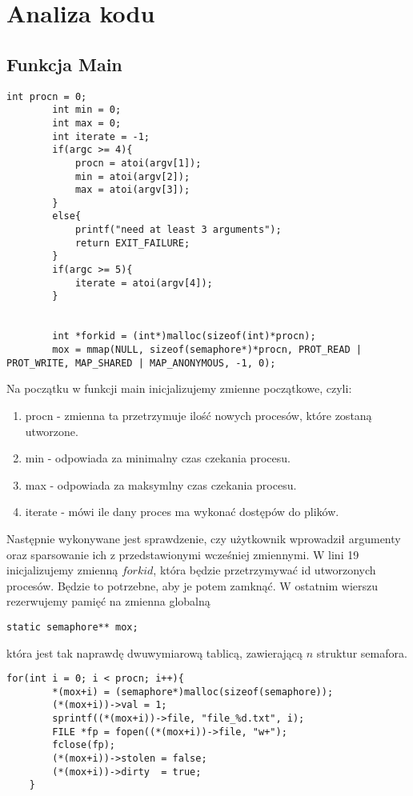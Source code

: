 \documentclass[11pt, wide]{article}
\begin{document}
    \section{Analiza kodu}
    \subsection{Funkcja Main}
    \begin{lstlisting}[style=CStyle]
        int procn = 0;
        int min = 0;
        int max = 0;
        int iterate = -1;
        if(argc >= 4){
            procn = atoi(argv[1]);
            min = atoi(argv[2]);
            max = atoi(argv[3]);       
        }
        else{
            printf("need at least 3 arguments");
            return EXIT_FAILURE;
        }
        if(argc >= 5){
            iterate = atoi(argv[4]);
        }
            
    
        int *forkid = (int*)malloc(sizeof(int)*procn);
        mox = mmap(NULL, sizeof(semaphore*)*procn, PROT_READ | PROT_WRITE, MAP_SHARED | MAP_ANONYMOUS, -1, 0);\end{lstlisting}
        Na początku w funkcji main inicjalizujemy zmienne początkowe, czyli:
        \begin{enumerate}
            \item procn - zmienna ta przetrzymuje ilość nowych procesów, które zostaną utworzone.
            \item min   - odpowiada za minimalny czas czekania procesu.
            \item max   - odpowiada za maksymlny czas czekania procesu.
            \item iterate - mówi ile dany proces ma wykonać dostępów do plików.
        \end{enumerate}
        Następnie wykonywane jest sprawdzenie, czy użytkownik wprowadził argumenty oraz sparsowanie ich z przedstawionymi wcześniej 
        zmiennymi.
        W lini 19 inicjalizujemy zmienną $forkid$, która będzie przetrzymywać id utworzonych procesów. Będzie to potrzebne,
        aby je potem zamknąć. 
        W ostatnim wierszu rezerwujemy pamięć na zmienna globalną
        \begin{lstlisting}[style=CStyle]
        static semaphore** mox;\end{lstlisting}
        która jest tak naprawdę dwuwymiarową tablicą, zawierającą $n$ struktur semafora.
        \begin{lstlisting}[style=CStyle]
    for(int i = 0; i < procn; i++){
        *(mox+i) = (semaphore*)malloc(sizeof(semaphore));
        (*(mox+i))->val = 1;
        sprintf((*(mox+i))->file, "file_%d.txt", i);
        FILE *fp = fopen((*(mox+i))->file, "w+");
        fclose(fp);
        (*(mox+i))->stolen = false;
        (*(mox+i))->dirty  = true;
    }\end{lstlisting}
\end{document}
